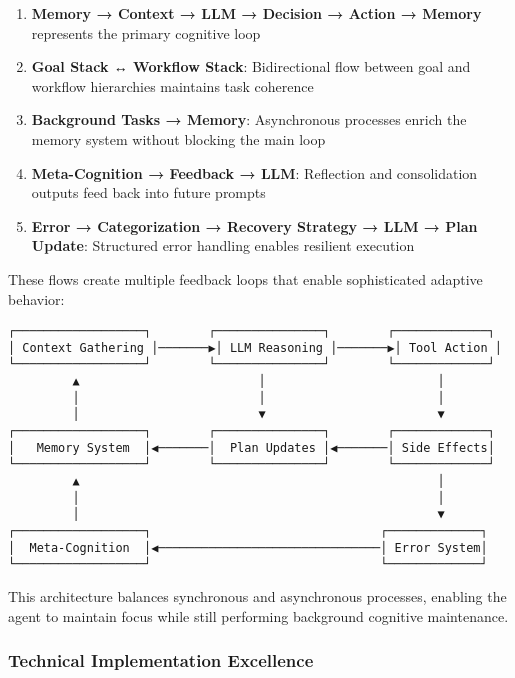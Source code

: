 \documentclass[12pt,a4paper]{article}
\begin{document}
\begin{enumerate}[label=\arabic*.]
    \item \textbf{Memory → Context → LLM → Decision → Action → Memory} represents the primary cognitive loop
    \item \textbf{Goal Stack ↔ Workflow Stack}: Bidirectional flow between goal and workflow hierarchies maintains task coherence
    \item \textbf{Background Tasks → Memory}: Asynchronous processes enrich the memory system without blocking the main loop
    \item \textbf{Meta-Cognition → Feedback → LLM}: Reflection and consolidation outputs feed back into future prompts
    \item \textbf{Error → Categorization → Recovery Strategy → LLM → Plan Update}: Structured error handling enables resilient execution
\end{enumerate}

These flows create multiple feedback loops that enable sophisticated adaptive behavior:
\begin{verbatim}
┌──────────────────┐        ┌───────────────┐        ┌─────────────┐
│ Context Gathering │───────▶│ LLM Reasoning │───────▶│ Tool Action │
└──────────────────┘        └───────────────┘        └─────────────┘
         ▲                         │                        │
         │                         │                        │
         │                         ▼                        ▼
┌──────────────────┐        ┌───────────────┐        ┌─────────────┐
│   Memory System  │◀───────│  Plan Updates │◀───────│ Side Effects│
└──────────────────┘        └───────────────┘        └─────────────┘
         ▲                                                  │
         │                                                  │
         │                                                  ▼
┌──────────────────┐                                ┌─────────────┐
│  Meta-Cognition  │◀───────────────────────────────│ Error System│
└──────────────────┘                                └─────────────┘
\end{verbatim}
This architecture balances synchronous and asynchronous processes, enabling the agent to maintain focus while still performing background cognitive maintenance.

\subsubsection*{Technical Implementation Excellence}
\end{document}
